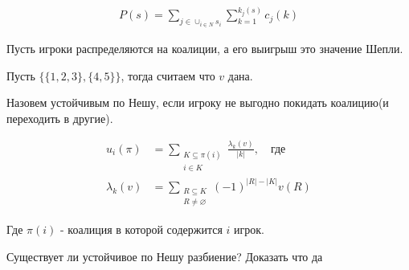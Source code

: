 \begin{align*}
	P(s) = \sum_{j \in \cup_{i \in N} s_i} \sum_{k = 1}^{k_j(s)} c_j(k)
\end{align*}

\begin{problem}
	Пусть игроки распределяются на коалиции, а его выигрыш это значение Шепли.

	Пусть $\{\{1, 2, 3\}, \{4, 5\}\}$, тогда считаем что $v$ дана.

	Назовем устойчивым по Нешу, если игроку не выгодно покидать коалицию(и переходить в другие).

	\begin{align*}
		u_i(\pi) &= \sum_{\substack{K \subseteq \pi(i) \\ i \in K}} \frac{\lambda_k(v)}{|k|}, \quad \text{где} \\
		\lambda_k(v) &= \sum_{\substack{R \subseteq K \\ R \neq \varnothing}} (-1)^{|R| - |K|} v(R)
	\end{align*}

	Где $\pi(i)$ - коалиция в которой содержится  $i$ игрок.

	Существует ли устойчивое по Нешу разбиение? Доказать что да
\end{problem}


